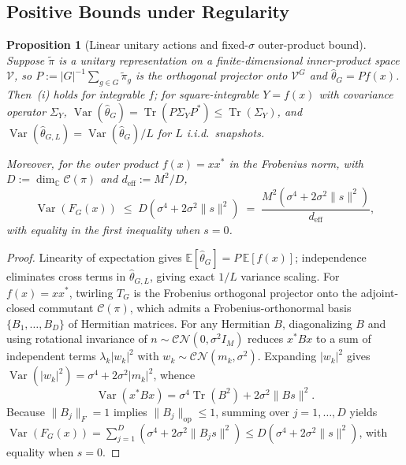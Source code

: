 \documentclass[11pt]{article}
\theoremstyle{plain}
\newtheorem{proposition}[theorem]{Proposition}
\theoremstyle{definition}
\theoremstyle{remark}
\DeclareMathOperator{\Tr}{Tr}
\DeclareMathOperator{\Var}{Var}
\DeclareMathOperator{\op}{op}
\begin{document}
\subsection{Positive Bounds under Regularity}

\begin{proposition}[Linear unitary actions and fixed-$\sigma$ outer-product bound]\label{prop:gaat-pos}
Suppose $\tilde{\pi}$ is a unitary representation on a finite-dimensional inner-product space $\mathcal{V}$, so $P := |G|^{-1}\sum_{g \in G} \tilde{\pi}_g$ is the orthogonal projector onto $\mathcal{V}^G$ and $\hat{\theta}_G = P f(x)$. Then~\textup{(i)} holds for integrable $f$; for square-integrable $Y = f(x)$ with covariance operator $\Sigma_Y$, $\Var(\hat{\theta}_G) = \Tr(P\Sigma_Y P^*) \le \Tr(\Sigma_Y)$, and $\Var(\hat{\theta}_{G,L}) = \Var(\hat{\theta}_G)/L$ for $L$ i.i.d.\ snapshots.

Moreover, for the outer product $f(x) = xx^*$ in the Frobenius norm, with $D := \dim_{\mathbb{C}}\mathcal{C}(\pi)$ and $d_{\mathrm{eff}} := M^2/D$,
\begin{equation}\label{eq:gaat-cov}
\Var(F_G(x)) \;\le\; D(\sigma^4 + 2\sigma^2\|s\|^2) \;=\; \frac{M^2(\sigma^4 + 2\sigma^2\|s\|^2)}{d_{\mathrm{eff}}},
\end{equation}
with equality in the first inequality when $s = 0$.
\end{proposition}

\begin{proof}
Linearity of expectation gives $\mathbb{E}[\hat{\theta}_G] = P\,\mathbb{E}[f(x)]$; independence eliminates cross terms in $\hat{\theta}_{G,L}$, giving exact $1/L$ variance scaling. For $f(x) = xx^*$, twirling $T_G$ is the Frobenius orthogonal projector onto the adjoint-closed commutant $\mathcal{C}(\pi)$, which admits a Frobenius-orthonormal basis $\{B_1, \dots, B_D\}$ of Hermitian matrices. For any Hermitian $B$, diagonalizing $B$ and using rotational invariance of $n \sim \mathcal{CN}(0, \sigma^2 I_M)$ reduces $x^* B x$ to a sum of independent terms $\lambda_k |w_k|^2$ with $w_k \sim \mathcal{CN}(m_k, \sigma^2)$. Expanding $|w_k|^2$ gives $\Var(|w_k|^2) = \sigma^4 + 2\sigma^2 |m_k|^2$, whence
\[
\Var(x^* B x) = \sigma^4 \Tr(B^2) + 2\sigma^2 \|Bs\|^2.
\]
Because $\|B_j\|_F = 1$ implies $\|B_j\|_{\op} \le 1$, summing over $j = 1, \dots, D$ yields $\Var(F_G(x)) = \sum_{j=1}^D (\sigma^4 + 2\sigma^2\|B_j s\|^2) \le D(\sigma^4 + 2\sigma^2\|s\|^2)$, with equality when $s = 0$.
\end{proof}
\end{document}
